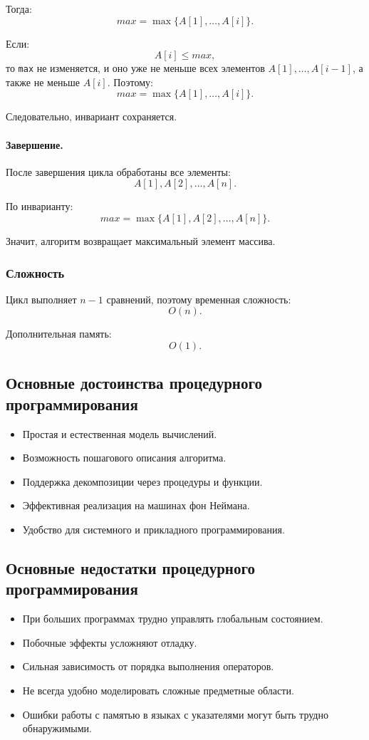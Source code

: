 \documentclass[12pt,a4paper]{article}
\begin{document}
Тогда:
\[
    max = \max\{A[1], \dots, A[i]\}.
\]

Если:
\[
    A[i] \le max,
\]
то \texttt{max} не изменяется, и оно уже не меньше всех элементов $A[1], \dots, A[i-1]$, а также не меньше $A[i]$. Поэтому:
\[
    max = \max\{A[1], \dots, A[i]\}.
\]

Следовательно, инвариант сохраняется.

\paragraph{Завершение.}

После завершения цикла обработаны все элементы:
\[
    A[1], A[2], \dots, A[n].
\]

По инварианту:
\[
    max = \max\{A[1], A[2], \dots, A[n]\}.
\]

Значит, алгоритм возвращает максимальный элемент массива.

\subsubsection{Сложность}

Цикл выполняет $n-1$ сравнений, поэтому временная сложность:
\[
    O(n).
\]

Дополнительная память:
\[
    O(1).
\]

\subsection{Основные достоинства процедурного программирования}

\begin{itemize}
    \item Простая и естественная модель вычислений.
    \item Возможность пошагового описания алгоритма.
    \item Поддержка декомпозиции через процедуры и функции.
    \item Эффективная реализация на машинах фон Неймана.
    \item Удобство для системного и прикладного программирования.
\end{itemize}

\subsection{Основные недостатки процедурного программирования}

\begin{itemize}
    \item При больших программах трудно управлять глобальным состоянием.
    \item Побочные эффекты усложняют отладку.
    \item Сильная зависимость от порядка выполнения операторов.
    \item Не всегда удобно моделировать сложные предметные области.
    \item Ошибки работы с памятью в языках с указателями могут быть трудно обнаружимыми.
\end{itemize}
\end{document}
